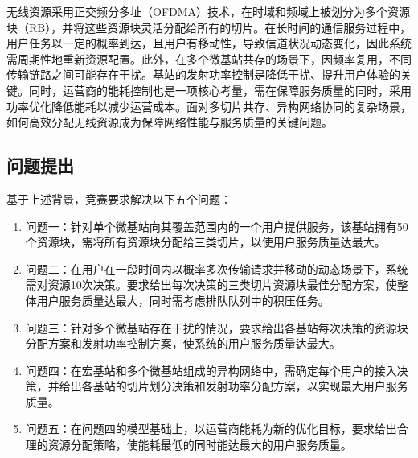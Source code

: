 \documentclass{ctexart}
\begin{document}
无线资源采用正交频分多址（OFDMA）技术，在时域和频域上被划分为多个资源块（RB），并将这些资源块灵活分配给所有的切片。在长时间的通信服务过程中，用户任务以一定的概率到达，且用户有移动性，导致信道状况动态变化，因此系统需周期性地重新资源配置。此外，在多个微基站共存的场景下，因频率复用，不同传输链路之间可能存在干扰。基站的发射功率控制是降低干扰、提升用户体验的关键。同时，运营商的能耗控制也是一项核心考量，需在保障服务质量的同时，采用功率优化降低能耗以减少运营成本。面对多切片共存、异构网络协同的复杂场景，如何高效分配无线资源成为保障网络性能与服务质量的关键问题。

\subsection{问题提出}
基于上述背景，竞赛要求解决以下五个问题：

\begin{enumerate}
 \item 问题一：针对单个微基站向其覆盖范围内的一个用户提供服务，该基站拥有50个资源块，需将所有资源块分配给三类切片，以使用户服务质量达最大。
 \item 问题二：在用户在一段时间内以概率多次传输请求并移动的动态场景下，系统需对资源10次决策。要求给出每次决策的三类切片资源块最佳分配方案，使整体用户服务质量达最大，同时需考虑排队队列中的积压任务。
 \item 问题三：针对多个微基站存在干扰的情况，要求给出各基站每次决策的资源块分配方案和发射功率控制方案，使系统的用户服务质量达最大。
 \item 问题四：在宏基站和多个微基站组成的异构网络中，需确定每个用户的接入决策，并给出各基站的切片划分决策和发射功率分配方案，以实现最大用户服务质量。
 \item 问题五：在问题四的模型基础上，以运营商能耗为新的优化目标，要求给出合理的资源分配策略，使能耗最低的同时能达最大的用户服务质量。
\end{enumerate}
\end{document}
